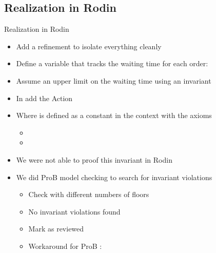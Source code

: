 \documentclass[
	hyperref={pdfusetitle,hidelinks},
	10pt,
    handout,
]{beamer}
\begin{document}
\subsection{Realization in Rodin} %

\begin{frame}{Realization in Rodin}
	\begin{itemize}
		\item<+-> Add a refinement to isolate everything cleanly
		\item<+-> Define a variable  that tracks the waiting time for each order: 
		\item<+-> Assume an upper limit on the waiting time using an invariant
		\item<+-> In  add the Action
		\\
		\item<+-> Where  is defined as a constant in the context with the axioms \\
		\begin{itemize}
			\item {}
			\item {}
		 \end{itemize}
		\item<+->We were not able to proof this invariant in Rodin
		\item<+->We did ProB model checking to search for invariant violations
		\begin{itemize}
			\item<+-> Check with different numbers of floors 
			\item<+-> No invariant violations found
			\item<+-> Mark as reviewed
			\item<+-> Workaround for ProB :
		\end{itemize}
	\end{itemize}
\end{frame}
\end{document}
